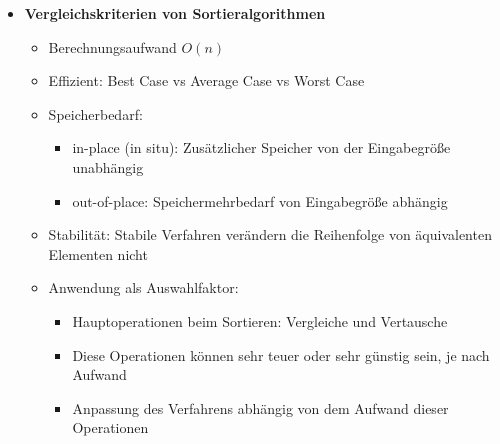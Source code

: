 \begin{itemize}
        \item \textbf{Vergleichskriterien von Sortieralgorithmen}
            \begin{itemize}
                \item Berechnungsaufwand $O(n)$
                \item Effizient: Best Case vs Average Case vs Worst Case
                \item Speicherbedarf:
                    \begin{itemize}
                        \item in-place (in situ): Zusätzlicher Speicher von der Eingabegrö\ss e unabhängig
                        \item out-of-place: Speichermehrbedarf von Eingabegrö\ss e abhängig
                    \end{itemize}
                \item Stabilität: Stabile Verfahren verändern die Reihenfolge von äquivalenten Elementen nicht
                \item Anwendung als Auswahlfaktor: 
                    \begin{itemize}
                        \item Hauptoperationen beim Sortieren: Vergleiche und Vertausche
                        \item Diese Operationen können sehr teuer oder sehr günstig sein, je nach Aufwand
                        \item Anpassung des Verfahrens abhängig von dem Aufwand dieser Operationen
                    \end{itemize}    
            \end{itemize}
    \end{itemize}    

    \pagebreak

